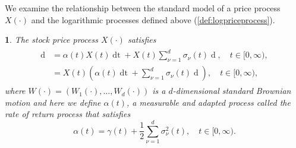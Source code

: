 \documentclass[british]{amsart}
\numberwithin{equation}{section}
\numberwithin{figure}{section}
\theoremstyle{plain}
\newtheorem{thm}{\protect\theoremname}[section]
\theoremstyle{definition}
\theoremstyle{plain}
\theoremstyle{plain}
\theoremstyle{plain}
\theoremstyle{remark}
\theoremstyle{plain}
\providecommand{\theoremname}{Theorem}
\renewcommand{\d}[1]{\mathop{\mathrm{d}{#1}}}
\newcommand{\ranget}{t\in[0,\infty)}
\begin{document}
We examine the relationship between the standard model of a price process 
$X(\cdot)$ and the logarithmic processes defined above 
(\ref{def:logpriceprocess}). 

\begin{thm} \cite{fernholz2002} The stock price process $X(\cdot)$ satisfies
	\begin{gather}
		\begin{split}
			\d{X(t)}
				& = \alpha(t)X(t)\d{t} + X(t)\sum_{\nu=1}^{d} \sigma_{\nu}(t){\d{W_{\nu}(t)}}, \quad \ranget, \\
				& = X(t) \left( \alpha(t)\d{t} + \sum_{\nu=1}^{d} 
							\sigma_{\nu}(t){\d{W_{\nu}(t)}} \right), \quad \ranget,
		\end{split}
	\end{gather}
	where $W(\cdot)=(W_{1}(\cdot),\dots,W_{d}(\cdot))$ is a $d$-dimensional 
	standard Brownian motion and here we define $\alpha(t)$, a 	measurable and 
	adapted process called the \textit{rate of return process} that satisfies 
	\begin{equation}
		\label{eq:alpha}
		\alpha(t) = \gamma(t) + \frac{1}{2} \sum_{\nu=1}^{d} \sigma_{\nu}^2(t),
		\quad \ranget.
	\end{equation}
\end{thm}
\end{document}
